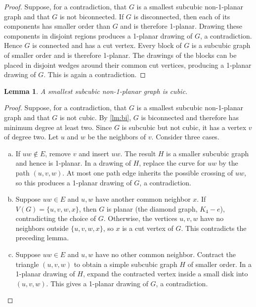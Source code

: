 \documentclass[a4paper,11pt]{article}
\theoremstyle{plain}
\newtheorem{lemma}{Lemma}
\theoremstyle{definition}  %
\begin{document}
\begin{proof}
    Suppose, for a contradiction, that $G$ is a smallest subcubic
    non-1-planar graph and that $G$ is not biconnected.  If $G$ is
    disconnected, then each of its components has smaller order than $G$ and
    is therefore 1-planar.  Drawing these components in disjoint regions
    produces a 1-planar drawing of $G$, a contradiction.
    Hence $G$ is connected and has a cut vertex.  Every block of $G$ is a
    subcubic graph of smaller order and is therefore 1-planar.  The drawings
    of the blocks can be placed in disjoint wedges around their common cut
    vertices, producing a 1-planar drawing of $G$.  This is again a
    contradiction.
\end{proof}

\begin{lemma}
    \label{lm:cubic}
    A smallest subcubic non-1-planar graph is cubic.
\end{lemma}

\begin{proof}
    Suppose, for a contradiction, that $G$ is a smallest subcubic
    non-1-planar graph and that $G$ is not cubic. By \cref{lm:bi},
    $G$ is biconnected and therefore has minimum degree at least two.  Since
    $G$ is subcubic but not cubic, it has a vertex $v$ of degree two.  Let
    $u$ and $w$ be the neighbors of $v$.  Consider three cases.
    \begin{enumerate}[(a)]
        \item If $uw\notin E$, remove $v$ and insert $uw$.  The result $H$ is
        a smaller subcubic graph and hence is 1-planar.  In a drawing of $H$,
        replace the curve for $uw$ by the path $(u,v,w)$.  At most one path
        edge inherits the possible crossing of $uw$, so this produces a
        1-planar drawing of $G$, a contradiction.

        \item Suppose $uw\in E$ and $u,w$ have another common neighbor $x$.
        If $V(G)=\{u,v,w,x\}$, then $G$ is planar (the diamond graph, $K_4-e$), contradicting the choice
        of $G$.  Otherwise, the vertices $u,v,w$ have no neighbors outside
        $\{u,v,w,x\}$, so $x$ is a cut vertex of $G$.  This contradicts the
        preceding lemma.

        \item Suppose $uw\in E$ and $u,w$ have no other common neighbor.
        Contract the triangle $(u,v,w)$ to obtain a simple subcubic graph
        $H$ of smaller order.  In a 1-planar drawing of $H$, expand the
        contracted vertex inside a small disk into $(u,v,w)$.  This gives a
        1-planar drawing of $G$, a contradiction.
    \end{enumerate}
\end{proof}
\end{document}
